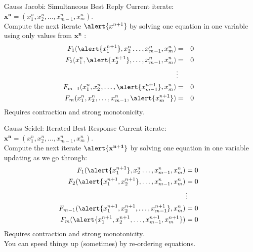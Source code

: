 \documentclass[xcolor=pdftex,dvipsnames,table,mathserif,aspectratio=169]{beamer}
\begin{document}
\begin{frame}{Gauss Jacobi: Simultaneous Best Reply}
Current iterate: $\mathbf{x^n} = (x_1^n,x_2^n,\ldots,x_{m-1}^n,x_m^n)$.\\
\vspace{0.5cm}
Compute the next iterate $\alert{x^{n+1}}$ by solving one equation in one variable using only values from $\mathbf{x^n}$ : 
\begin{eqnarray*}
F_1 (\alert{x_1^{n+1}},x_2^n \ldots, x_{m-1}^n, x_m^n)  &=& 0 \\
F_2  (x_1^n,\alert{x_2^{n+1}},\ldots,x_{m-1}^n,x_m^n)  &=& 0\\
&\vdots&\\ 
F_{m-1}  (x_1^n,x_2^n,\ldots,\alert{x_{m-1}^{n+1}},x_m^n)  &=& 0\\
F_m  (x_1^n,x_2^n,\ldots,x_{m-1}^n, \alert{x_m^{n+1}})  &=& 0
\end{eqnarray*}
Requires contraction and strong monotonicity.
\end{frame} 

\begin{frame}{Gauss Seidel: Iterated Best Response}
Current iterate: $\mathbf{x^n} = (x_1^n,x_2^n,\ldots,x_{m-1}^n,x_m^n)$.\\
\vspace{0.5cm}
Compute the next iterate $\alert{\mathbf{x^{n+1}}}$ by solving one equation in one variable updating as we go through:
\begin{align*}
F_1 (\alert{x_1^{n+1}},x_2^n \ldots, x_{m-1}^n, x_m^n)  &= 0 \\
F_2  (\alert{x_1^{n+1},x_2^{n+1}},\ldots,x_{m-1}^n,x_m^n)  &= 0\\
&\vdots\\ 
F_{m-1}  (\alert{x_1^{n+1},x_2^{n+1},\ldots,x_{m-1}^{n+1}},x_m^n)  &= 0\\
F_m (\alert{x_1^{n+1},x_2^{n+1},\ldots,x_{m-1}^{n+1}, x_m^{n+1}})  &= 0
\end{align*}
Requires contraction and strong monotonicity.\\
You can speed things up (sometimes) by re-ordering equations.

\end{frame} 
\end{document}
